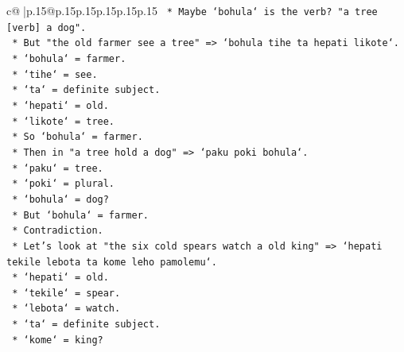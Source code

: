 \documentclass{article}
\begin{document}
{\begin{supertabular}{c@{$\;$}|p{.15\linewidth}@{}p{.15\linewidth}p{.15\linewidth}p{.15\linewidth}p{.15\linewidth}p{.15\linewidth}}
{{{\texttt{                                            *   Maybe `bohula` is the verb? "a tree {[}verb{]} a dog".} \\
\texttt{                                            *   But "the old farmer see a tree" => `bohula tihe ta hepati likote`.} \\
\texttt{                                                *   `bohula` = farmer.} \\
\texttt{                                                *   `tihe` = see.} \\
\texttt{                                                *   `ta` = definite subject.} \\
\texttt{                                                *   `hepati` = old.} \\
\texttt{                                                *   `likote` = tree.} \\
\texttt{                                            *   So `bohula` = farmer.} \\
\texttt{                                            *   Then in "a tree hold a dog" => `paku poki bohula`.} \\
\texttt{                                                *   `paku` = tree.} \\
\texttt{                                                *   `poki` = plural.} \\
\texttt{                                                *   `bohula` = dog?} \\
\texttt{                                            *   But `bohula` = farmer.} \\
\texttt{                                            *   Contradiction.} \\
\texttt{                                            *   Let's look at "the six cold spears watch a old king" => `hepati tekile lebota ta kome leho pamolemu`.} \\
\texttt{                                                *   `hepati` = old.} \\
\texttt{                                                *   `tekile` = spear.} \\
\texttt{                                                *   `lebota` = watch.} \\
\texttt{                                                *   `ta` = definite subject.} \\
\texttt{                                                *   `kome` = king?} \\
}}}
\end{supertabular}}
\end{document}
